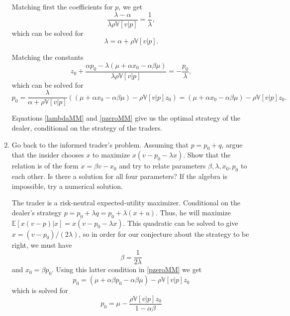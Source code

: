 \documentclass[11pt
, answers
]{exam}
\begin{document}
\begin{enumerate}[label=(\alph*). ]
\begin{solution}
 Matching first the coefficients for $p$, we get
\[
 \frac{\lambda-\alpha}{\lambda \rho \mathbb{V}[v|p]} =\frac{1}{\lambda},
\]
which can be solved for
\begin{equation} \label{lambdaMM}
\lambda =  \alpha + \rho \mathbb{V}[v|p].
\end{equation}

Matching the constants
\[
z_{0}+\frac{\alpha p_{0}-\lambda(\mu + \alpha x_{0} - \alpha \beta \mu) }{\lambda \rho \mathbb{V}[v|p]} = -\frac{p_{0}}{\lambda},
\]
which can be solved for 
\begin{equation} \label{pzeroMM}
p_{0} =  \frac{\lambda}{\alpha+\rho \mathbb{V}[v|p]}((\mu + \alpha x_{0} - \alpha \beta \mu) - \rho \mathbb{V}[v|p] z_{0}) =(\mu + \alpha x_{0} - \alpha \beta \mu) - \rho \mathbb{V}[v|p] z_{0}.
\end{equation}

Equations \eqref{lambdaMM} and \eqref{pzeroMM} give us the optimal strategy of the dealer, conditional on the strategy of the traders.
\end{solution}

\item Go back to the informed trader's problem. Assuming that $p=p_{0}+q$, argue that the insider chooses $x$ to maximize $x (v-p_{0} - \lambda x)$. Show that the relation is of the form $x =\beta v - x_{0}$ and try to relate parameters $\beta, \lambda, x_{0}, p_{0}$ to each other. Is there a solution for all four parameters? If the algebra is impossible, try a numerical solution.

\begin{solution}
The trader is a risk-neutral expected-utility maximizer. Conditional on the dealer's strategy $p=p_{0}+\lambda q=p_{0}+\lambda(x+u)$. Thus, he will maximize $\mathbb{E}[x(v-p)|x] = x(v-p_{0}-\lambda x)$. This quadratic can be solved to give $x=(v-p_{0})/(2\lambda)$, so in order for our conjecture about the strategy to be right, we must have
\begin{equation} \label{lambdatrader}
\beta=\frac{1}{2\lambda}
\end{equation}
 and $x_{0}=\beta p_{0}$. Using this latter condition in \eqref{pzeroMM} we get
 \[
 p_{0} = (\mu + \alpha \beta p_0 - \alpha \beta \mu) - \rho \mathbb{V}[v|p] z_{0}
 \]
 which is solved for
 \[
 p_{0} = \mu- \frac{\rho \mathbb{V}[v|p] z_0}{1-\alpha\beta}
 \]
 

\end{solution}
\end{enumerate}
\end{document}
